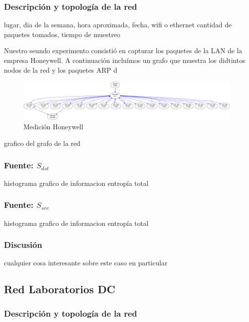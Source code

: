 \documentclass[10pt, a4paper]{article}
\begin{document}
\subsubsection{Descripción y topología de la red}

lugar, dia de la semana, hora aproximada, fecha, wifi o ethernet
cantidad de paquetes tomados, tiempo de muestreo

Nuestro seundo experimento consistió en capturar los paquetes de la LAN de la empresa Honeywell. A continuación incluímos un grafo que muestra los didtintos nodos de la red y los paquetes ARP d
 
\begin{figure}
 \begin{center}
  \includegraphics[width=\linewidth]{../imgs/prueba_laburo-ips_red.png}
  \caption{Medición Honeywell}
 \end{center}
\end{figure}

grafico del grafo de la red

\subsubsection{Fuente: $S_{dst}$}

histograma
grafico de informacion
entropía total

\subsubsection{Fuente: $S_{src}$}

histograma
grafico de informacion
entropía total

\subsubsection{Discusión}

cualquier cosa interesante sobre este caso en particular

\subsection{Red Laboratorios DC}

\subsubsection{Descripción y topología de la red}
\end{document}

